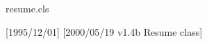 \begin{filecontents*}{resume.cls}
%
%
%
%
%
%
%
%
%
%
%
%
%
%
%
%

[1995/12/01]
[2000/05/19 v1.4b Resume class]



\newif\if@line
\newif\if@margin


\end{filecontents*}
